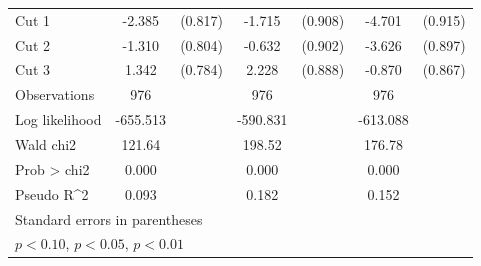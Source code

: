 \begin{table}[htbp]
\begin{tabular}{l*{3}{cc}}
Cut 1               &      -2.385\sym{***}&     (0.817)&      -1.715\sym{*}  &     (0.908)&      -4.701\sym{***}&     (0.915)\\
Cut 2               &      -1.310         &     (0.804)&      -0.632         &     (0.902)&      -3.626\sym{***}&     (0.897)\\
Cut 3               &       1.342\sym{*}  &     (0.784)&       2.228\sym{**} &     (0.888)&      -0.870         &     (0.867)\\
\hline
Observations        &         976         &            &         976         &            &         976         &            \\
Log likelihood      &    -655.513         &            &    -590.831         &            &    -613.088         &            \\
Wald chi2           &      121.64         &            &      198.52         &            &      176.78         &            \\
Prob > chi2         &       0.000         &            &       0.000         &            &       0.000         &            \\
Pseudo R^2          &       0.093         &            &       0.182         &            &       0.152         &            \\
\hline\hline
\multicolumn{7}{l}{\footnotesize Standard errors in parentheses}\\
\multicolumn{7}{l}{\footnotesize \sym{*} \(p<0.10\), \sym{**} \(p<0.05\), \sym{***} \(p<0.01\)}\\
\end{tabular}
\end{table}
